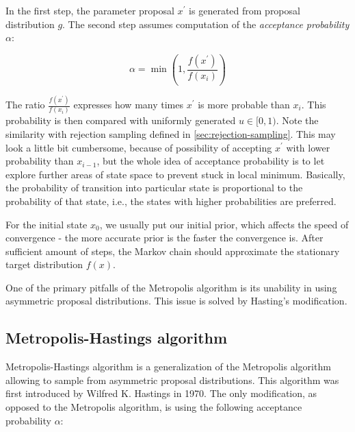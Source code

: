\documentclass[
  digital, %
  oneside, %
  lof,     %
  lot,     %
]{fithesis4}
\begin{document}
In the first step, the parameter proposal $x^\prime$ is generated from proposal distribution $g$.
The second step assumes computation of the \textit{acceptance probability} $\alpha$:

\begin{equation}\label{eq:metropolis-alpha}
  \alpha = \min \left(1, \frac{f(x^\prime)}{f(x_{i})}\right)
\end{equation}

The ratio $\frac{f(x^\prime)}{f(x_{i})}$ expresses 
how many times $x^\prime$ is more probable than $x_{i}$.
This probability is then compared with uniformly generated $u \in [0, 1)$. 
Note the similarity with rejection sampling defined in 
\autoref{sec:rejection-sampling}.
This may look a little bit cumbersome, 
because of possibility of accepting $x^\prime$ with 
lower probability than $x_{i-1}$, but the 
whole idea of acceptance probability is to let 
explore further areas of state space to prevent 
stuck in local minimum. Basically, the 
probability of transition into particular state is
proportional to the probability of that state, i.e.,
the states with higher probabilities are preferred.

For the initial state 
$x_0$, we usually put our initial prior, 
which affects the speed of convergence - 
the more accurate prior is the faster the 
convergence is. After sufficient amount of steps, the Markov 
chain should approximate the stationary target 
distribution $f(x)$.

One of the primary pitfalls of the Metropolis algorithm is
its unability in using asymmetric proposal distributions.
This issue is solved by Hasting's modification.


\subsection{Metropolis-Hastings algorithm}

Metropolis-Hastings algorithm is a generalization
of the Metropolis algorithm allowing to sample from
asymmetric proposal distributions.
This algorithm was first introduced by 
Wilfred K. Hastings in 1970. 
The only modification, as opposed to the Metropolis algorithm, 
is using the following acceptance probability $\alpha$:
\end{document}
